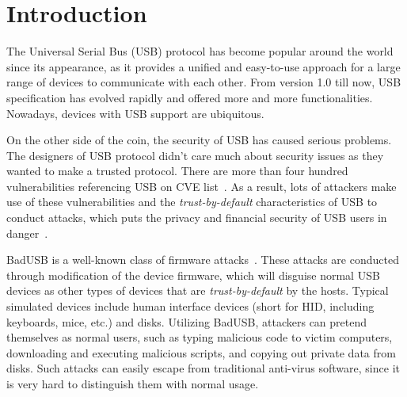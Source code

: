 \section{Introduction}
\label{sec:introduction}

The Universal Serial Bus (USB) protocol has become popular around the world since its appearance, as it provides a unified and easy-to-use approach for a large range of devices to communicate with each other.
From version 1.0 till now, USB specification has evolved rapidly and offered more and more functionalities.
Nowadays, devices with USB support are ubiquitous.

On the other side of the coin, the security of USB has caused serious problems.
The designers of USB protocol didn't care much about security issues as they wanted to make a trusted protocol.
There are more than four hundred vulnerabilities referencing USB on CVE list~\cite{website:CVE-list}.
As a result, lots of attackers make use of these vulnerabilities and the \textit{trust-by-default} characteristics of USB to conduct attacks, which puts the privacy and financial security of USB users in danger~\cite{sok}.

BadUSB is a well-known class of firmware attacks~\cite{badusb}.
These attacks are conducted through modification of the device firmware, which will disguise normal USB devices as other types of devices that are \textit{trust-by-default} by the hosts.
Typical simulated devices include human interface devices (short for HID, including keyboards, mice, etc.) and disks.
Utilizing BadUSB, attackers can pretend themselves as normal users, such as typing malicious code to victim computers, downloading and executing malicious scripts, and copying out private data from disks.
Such attacks can easily escape from traditional anti-virus software, since it is very hard to distinguish them with normal usage.

